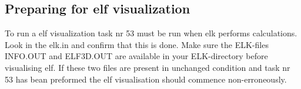 \subsection{Preparing for elf visualization}
To run a elf visualization task nr 53 must be run when elk performs calculations. Look in the elk.in and confirm that this is done. Make sure the ELK-files INFO.OUT and ELF3D.OUT are available in your ELK-directory before visualising elf. If these two files are present in unchanged condition and task nr 53 has bean preformed the elf visualisation should commence non-erroneously.



\newpage

